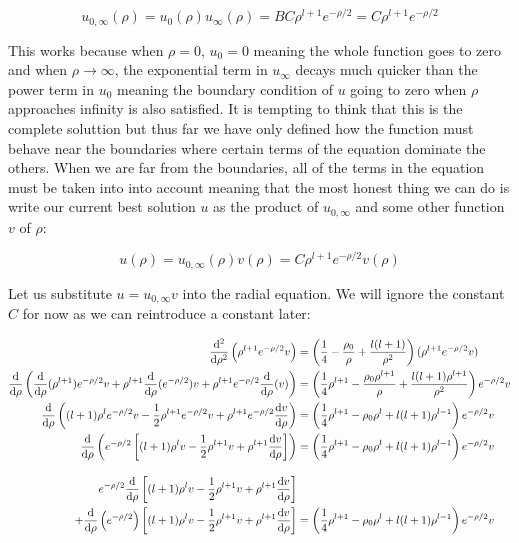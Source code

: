 \documentclass{article}
\begin{document}
    \begin{equation}
       u_{0,\infty}(\rho) = u_{0}(\rho)u_{\infty}(\rho) = BC\rho^{l + 1}e^{-\rho/2} = C\rho^{l + 1}e^{-\rho/2}
    \end{equation}

    This works because when $\rho = 0$, $u_{0} = 0$ meaning the whole function goes to zero and when $\rho \to \infty$, the exponential term in $u_{\infty}$ decays much quicker than the power term
    in $u_{0}$ meaning the boundary condition of $u$ going to zero when $\rho$ approaches infinity is also satisfied. It is tempting to think that this is the complete soluttion but thus far
    we have only defined how the function must behave near the boundaries where certain terms of the equation dominate the others. When we are far from the boundaries, all of the terms in the equation
    must be taken into into account meaning that the most honest thing we can do is write our current best solution $u$ as the product of $u_{0,\infty}$ and some other function $v$ of $\rho$:

    \begin{equation}
        u(\rho) = u_{0,\infty}(\rho)v(\rho) = C\rho^{l + 1}e^{-\rho/2}v(\rho)
    \end{equation}

    Let us substitute $u = u_{0,\infty}v$ into the radial equation. We will ignore the constant $C$ for now as we can reintroduce a constant later:

    \begin{align}
        \odv[order = 2]{}{\rho}\left( \rho^{l + 1}e^{-\rho/2}v \right) &= \left(\frac{1}{4} - \frac{\rho_{0}}{\rho} + \frac{l(l + 1)}{\rho^2}\right)(\rho^{l + 1}e^{-\rho/2}v) \\
        \odv{}{\rho}\left( \odv{}{\rho}(\rho^{l + 1})e^{-\rho/2}v + \rho^{l + 1}\odv{}{\rho}(e^{-\rho/2})v + \rho^{l + 1}e^{-\rho/2}\odv{}{\rho}(v)\right) &=
        \left(\frac{1}{4}\rho^{l+1} - \frac{\rho_{0}\rho^{l+1}}{\rho} + \frac{l(l + 1)\rho^{l+1}}{\rho^2}\right)e^{-\rho/2}v \\
        \odv{}{\rho}\left((l + 1)\rho^{l}e^{-\rho/2}v -\frac{1}{2}\rho^{l + 1}e^{-\rho/2}v + \rho^{l + 1}e^{-\rho/2}\odv{v}{\rho}\right) &=
        \left(\frac{1}{4}\rho^{l+1} - \rho_{0}\rho^{l} + l(l + 1)\rho^{l-1}\right)e^{-\rho/2}v \\
        \odv{}{\rho}\left(e^{-\rho/2}\left[(l + 1)\rho^{l}v -\frac{1}{2}\rho^{l + 1}v + \rho^{l + 1}\odv{v}{\rho}\right]\right) &=
        \left(\frac{1}{4}\rho^{l+1} - \rho_{0}\rho^{l} + l(l + 1)\rho^{l-1}\right)e^{-\rho/2}v \\[1em]
        e^{-\rho/2}\odv{}{\rho}\left[(l + 1)\rho^{l}v -\frac{1}{2}\rho^{l + 1}v + \rho^{l + 1}\odv{v}{\rho}\right]& \\
        + \odv{}{\rho}\left( e^{-\rho/2} \right)\left[ (l + 1)\rho^{l}v -\frac{1}{2}\rho^{l + 1}v + \rho^{l + 1}\odv{v}{\rho} \right] &= \left(\frac{1}{4}\rho^{l+1} - \rho_{0}\rho^{l}
        + l(l + 1)\rho^{l-1}\right)e^{-\rho/2}v
    \end{align}
\end{document}
